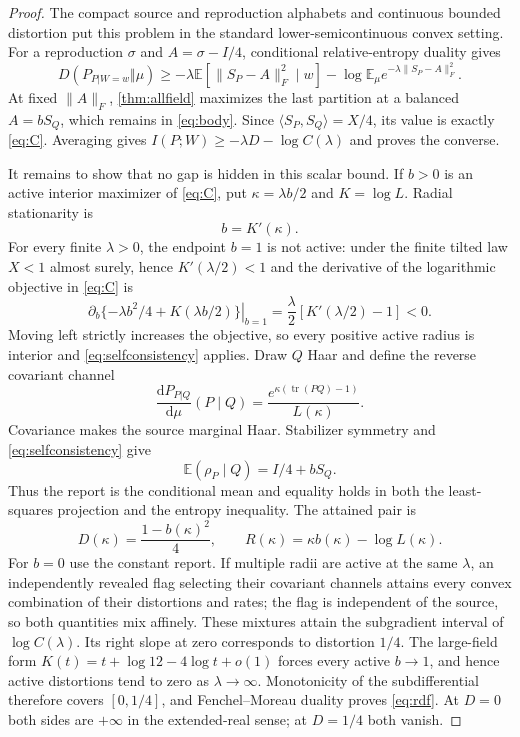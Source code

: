 \documentclass[11pt,a4paper]{article}
\newcommand{\tr}{\operatorname{tr}}
\newcommand{\E}{\mathbb E}
\newcommand{\dd}{\mathrm d}
\begin{document}
\begin{proof}
The compact source and reproduction alphabets and continuous bounded distortion put this problem in the standard lower-semicontinuous convex setting.  For a reproduction $\sigma$ and $A=\sigma-I/4$, conditional relative-entropy duality gives
\[
D(P_{P|W=w}\Vert\mu)\ge-\lambda\E[\lVert S_P-A\rVert_F^2\mid w]-\log\E_\mu e^{-\lambda\lVert S_P-A\rVert_F^2}.
\]
At fixed $\lVert A\rVert_F$, \cref{thm:allfield} maximizes the last partition at a balanced $A=bS_Q$, which remains in \cref{eq:body}.  Since $\langle S_P,S_Q\rangle=X/4$, its value is exactly \cref{eq:C}.  Averaging gives $I(P;W)\ge-\lambda D-\log C(\lambda)$ and proves the converse.

It remains to show that no gap is hidden in this scalar bound.  If $b>0$ is an active interior maximizer of \cref{eq:C}, put $\kappa=\lambda b/2$ and $K=\log L$.  Radial stationarity is
\begin{equation}\label{eq:selfconsistency}
b=K'(\kappa).
\end{equation}
For every finite $\lambda>0$, the endpoint $b=1$ is not active: under the finite tilted law $X<1$ almost surely, hence $K'(\lambda/2)<1$ and the derivative of the logarithmic objective in \cref{eq:C} is
\[
\left.\partial_b\{-\lambda b^2/4+K(\lambda b/2)\}\right|_{b=1}
=\frac{\lambda}{2}[K'(\lambda/2)-1]<0.
\]
Moving left strictly increases the objective, so every positive active radius is interior and \cref{eq:selfconsistency} applies.
Draw $Q$ Haar and define the reverse covariant channel
\begin{equation}\label{eq:channel}
\frac{\dd P_{P|Q}}{\dd\mu}(P\mid Q)=\frac{e^{\kappa(\tr(PQ)-1)}}{L(\kappa)}.
\end{equation}
Covariance makes the source marginal Haar.  Stabilizer symmetry and \cref{eq:selfconsistency} give
\[
\E(\rho_P\mid Q)=I/4+bS_Q.
\]
Thus the report is the conditional mean and equality holds in both the least-squares projection and the entropy inequality.  The attained pair is
\begin{equation}\label{eq:parametric}
D(\kappa)=\frac{1-b(\kappa)^2}{4},\qquad
R(\kappa)=\kappa b(\kappa)-\log L(\kappa).
\end{equation}
For $b=0$ use the constant report.  If multiple radii are active at the same $\lambda$, an independently revealed flag selecting their covariant channels attains every convex combination of their distortions and rates; the flag is independent of the source, so both quantities mix affinely.  These mixtures attain the subgradient interval of $\log C(\lambda)$.  Its right slope at zero corresponds to distortion $1/4$.  The large-field form $K(t)=t+\log12-4\log t+o(1)$ forces every active $b\to1$, and hence active distortions tend to zero as $\lambda\to\infty$.  Monotonicity of the subdifferential therefore covers $[0,1/4]$, and Fenchel--Moreau duality proves \cref{eq:rdf}.  At $D=0$ both sides are $+\infty$ in the extended-real sense; at $D=1/4$ both vanish.
\end{proof}
\end{document}
